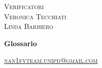 \documentclass[8pt]{article}
\begin{document}
\begin{titlepage}
\begin{minipage}[t]{0.47\textwidth}
		{\large{\textsc{Verificatori}}
			\vspace{3mm}
			{\\\large{\textsc{Veronica Tecchiati}\\}}
			{\large{\textsc{Linda Barbiero}}}

		}
		\vspace{4mm}\vspace{4mm}
	\end{minipage}
		\vspace{4cm}
		\begin{center}
			\begin{flushright}
				{\fontsize{30pt}{52pt}\selectfont \textbf{Glossario}} 
			\end{flushright}
			\vspace{3cm}
		\end{center}
		\vspace{10 cm}
		{\small \textsc{\href{mailto: nan1fyteam.unipd@gmail.com}{nan1fyteam.unipd@gmail.com}}}
	\end{titlepage}
	\pagestyle{mystyle}
\end{document}
